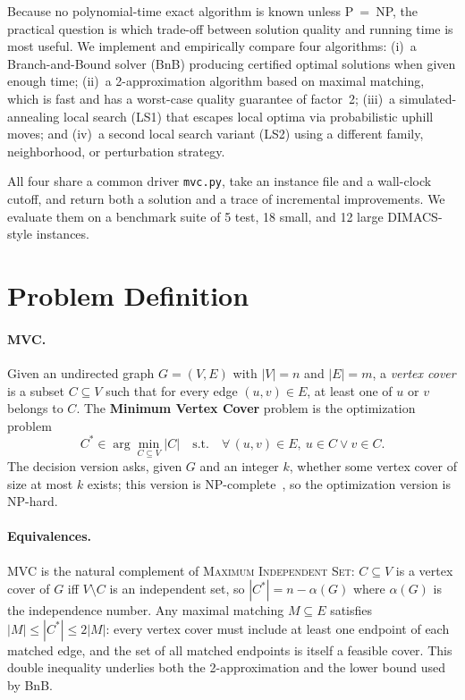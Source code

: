 \documentclass[sigconf]{acmart}
\begin{document}
Because no polynomial-time exact algorithm is known unless P~=~NP, the
practical question is which trade-off between solution quality and
running time is most useful. We implement and empirically compare four
algorithms:
(i)~a Branch-and-Bound solver (BnB) producing certified optimal
solutions when given enough time;
(ii)~a 2-approximation algorithm based on maximal matching, which is
fast and has a worst-case quality guarantee of factor~2;
(iii)~a simulated-annealing local search (LS1) that escapes local
optima via probabilistic uphill moves; and
(iv)~a second local search variant (LS2) using a different family,
neighborhood, or perturbation strategy.

All four share a common driver \texttt{mvc.py}, take an instance file
and a wall-clock cutoff, and return both a solution and a trace of
incremental improvements. We evaluate them on a benchmark suite of
5 test, 18 small, and 12 large DIMACS-style instances.

\section{Problem Definition}
\label{sec:problem}

\paragraph{MVC.} Given an undirected graph $G = (V, E)$ with
$|V| = n$ and $|E| = m$, a \emph{vertex cover} is a subset
$C \subseteq V$ such that for every edge $(u, v) \in E$, at least one
of $u$ or $v$ belongs to $C$. The \textbf{Minimum Vertex Cover} problem
is the optimization problem
\[
  C^* \in \arg\min_{C \subseteq V} |C|
  \quad \text{s.t.} \quad \forall\,(u,v) \in E,\ u \in C \vee v \in C.
\]
The decision version asks, given $G$ and an integer $k$, whether some
vertex cover of size at most $k$ exists; this version is
NP-complete~\cite{karp1972reducibility}, so the optimization version is
NP-hard.

\paragraph{Equivalences.} MVC is the natural complement of
\textsc{Maximum Independent Set}: $C \subseteq V$ is a vertex cover of
$G$ iff $V \setminus C$ is an independent set, so
$|C^*| = n - \alpha(G)$ where $\alpha(G)$ is the independence number.
Any maximal matching $M \subseteq E$ satisfies
$|M| \le |C^*| \le 2|M|$: every vertex cover must include at
least one endpoint of each matched edge, and the set of all matched
endpoints is itself a feasible cover. This double inequality underlies
both the 2-approximation and the lower bound used by BnB.
\end{document}
